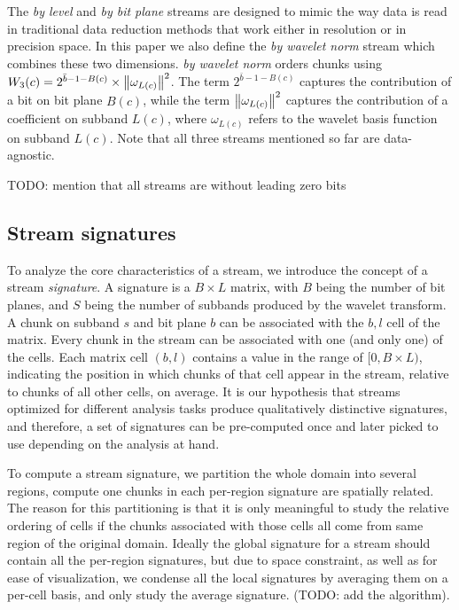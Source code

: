 The \emph{by level} and \emph{by bit plane} streams are designed to mimic the way data is read in
traditional data reduction methods that work either in resolution or in precision space. In this
paper we also define the \emph{by wavelet norm} stream which combines these two dimensions. \emph{by
wavelet norm} orders chunks using $W_3(c)=2^{\bar{b}-1-B(c)}\times \left\lVert\omega_{L(c)}\right\rVert^2$. The term
$2^{\bar{b}-1-B(c)}$ captures the contribution of a bit on bit plane $B(c)$, while the term
$\left\lVert\omega_{L(c)}\right\rVert^2$ captures the contribution of a coefficient on subband $L(c)$, where
$\omega_{L(c)}$ refers to the wavelet basis function on subband $L(c)$. Note that all three streams
mentioned so far are data-agnostic.

TODO: mention that all streams are without leading zero bits

\subsection{Stream signatures}
\label{sec:stream-signature}

To analyze the core characteristics of a stream, we introduce the concept of a stream
\emph{signature}. A signature is a $B \times L$ matrix, with $B$ being the number of bit planes, and
$S$ being the number of subbands produced by the wavelet transform. A chunk on subband $s$ and bit
plane $b$ can be associated with the $b, l$ cell of the matrix. Every chunk in the stream can be
associated with one (and only one) of the cells. Each matrix cell $(b,l)$ contains a value in the
range of $[0,B\times L)$, indicating the position in which chunks of that cell appear in the stream,
relative to chunks of all other cells, on average. It is our hypothesis that streams optimized for
different analysis tasks produce qualitatively distinctive signatures, and therefore, a set of
signatures can be pre-computed once and later picked to use depending on the analysis at hand.

To compute a stream signature, we partition the whole domain into several regions, compute one
chunks in each per-region signature are spatially related. The reason for this partitioning is that
it is only meaningful to study the relative ordering of cells if the chunks associated with those
cells all come from same region of the original domain. Ideally the global signature for a stream
should contain all the per-region signatures, but due to space constraint, as well as for ease of
visualization, we condense all the local signatures by averaging them on a per-cell basis, and only
study the average signature. (TODO: add the algorithm).

